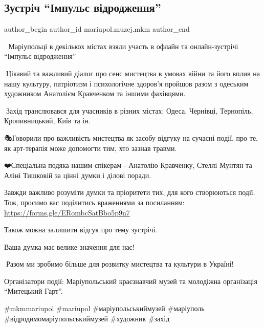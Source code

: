  
 
 
 
 

\subsection{Зустріч \enquote{Імпульс відродження}}
\label{sec:27_08_2023.fb.mariupol.muzej.mkm.1.zustrich_impuls_vidrodzhennja}

\ifcmt
 author_begin
   author_id mariupol.muzej.mkm
 author_end
\fi

📣 Маріупольці в декількох містах взяли участь в офлайн та онлайн-зустрічі
\enquote{Імпульс відродження}

🌟Цікавий та важливий діалог про сенс мистецтва в умовах війни та його вплив на
нашу культуру, патріотизм і психологічне здоров'я пройшов разом з одеським
художником Анатолієм Кравченком та іншими фахівцями.

🔗Захід транслювався для учасників в різних містах: Одеса, Чернівці, Тернопіль,
Кропивницький, Київ та ін.

🎭Говорили про важливість мистецтва як засобу відгуку на сучасні події, про те,
як арт-терапія може допомогти тим, хто зазнав травми.

❤️Спеціальна подяка нашим спікерам - Анатолію Кравченку, Стеллі Мунтян та Аліні
Тишковій за цінні думки і ділові поради.

Завжди важливо розуміти думки та пріоритети тих, для кого створюються події.
Тож, просимо вас поділитись враженнями за посиланням:
\url{https://forms.gle/ERombcSatBbo5p9n7}

Також можна залишити відгук про тему зустрічі.

Ваша думка має велике значення для нас! 📝

🤝Разом ми зробимо більше для розвитку мистецтва та культури в Україні!

Організатори події: Маріупольський краєзнавчий музей та молодіжна організація
\enquote{Митецький Гарт}.

\#mkmmariupol \#mariupol \#маріупольськиймузей \#маріуполь
\#відродимомаріупольськиймузей \#художник \#захід
